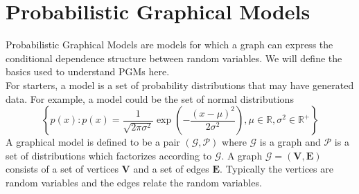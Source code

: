 \section{Probabilistic Graphical Models}
Probabilistic Graphical Models are models for which a graph can express the
conditional dependence structure between random variables. We will define
the basics used to understand PGMs here. \\
For starters, a model is a set of probability distributions that may
have generated data. For example, a model could be the set of normal distributions
\begin{equation}
  \left\{ p(x) : p(x) = \frac{1}{\sqrt{2\pi \sigma^2}} \exp \left( -\frac{(x-\mu)^2}{2\sigma^2} \right), \mu \in \mathbb{R}, \sigma^2 \in \mathbb{R}^+\right\}
\end{equation}
A graphical model is defined to be a pair $(\mathcal{G}, \mathcal{P})$ where
$\mathcal{G}$ is a graph and $\mathcal{P}$ is a set of distributions which
factorizes according to $\mathcal{G}$. A graph $\mathcal{G} = (\mathbf{V}, \mathbf{E})$
consists of a set of vertices $\mathbf{V}$ and a set of edges $\mathbf{E}$.
Typically the vertices are random variables and the edges relate the random variables.
